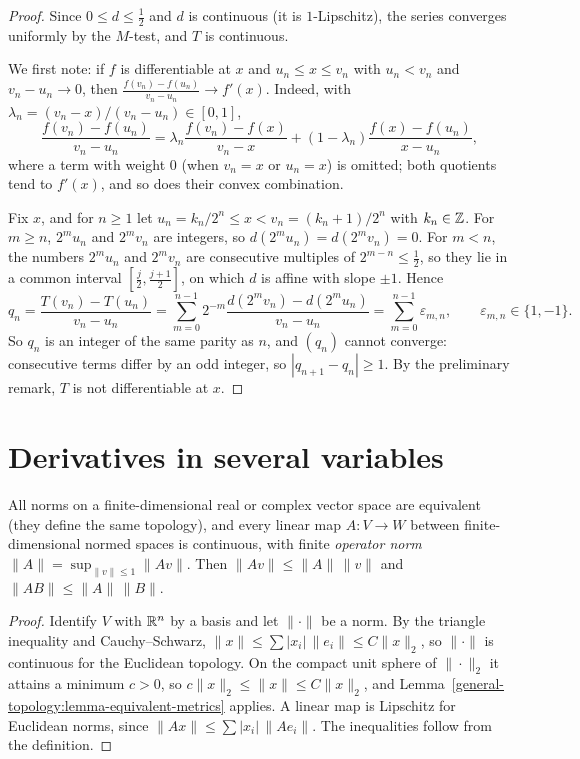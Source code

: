 \begin{proof}
Since $0 \leq d \leq \frac12$ and $d$ is continuous (it is $1$-Lipschitz), the series converges uniformly by the $M$-test, and $T$ is continuous.

We first note: if $f$ is differentiable at $x$ and $u_n \leq x \leq v_n$ with $u_n < v_n$ and $v_n - u_n \to 0$, then $\frac{f(v_n) - f(u_n)}{v_n - u_n} \to f'(x)$. Indeed, with $\lambda_n = (v_n - x)/(v_n - u_n) \in [0, 1]$,
\[
\frac{f(v_n) - f(u_n)}{v_n - u_n} = \lambda_n\frac{f(v_n) - f(x)}{v_n - x} + (1 - \lambda_n)\frac{f(x) - f(u_n)}{x - u_n},
\]
where a term with weight $0$ (when $v_n = x$ or $u_n = x$) is omitted; both quotients tend to $f'(x)$, and so does their convex combination.

Fix $x$, and for $n \geq 1$ let $u_n = k_n/2^n \leq x < v_n = (k_n + 1)/2^n$ with $k_n \in \mathbb{Z}$. For $m \geq n$, $2^mu_n$ and $2^mv_n$ are integers, so $d(2^mu_n) = d(2^mv_n) = 0$. For $m < n$, the numbers $2^mu_n$ and $2^mv_n$ are
consecutive multiples of $2^{m-n} \leq \frac12$, so they lie in a common interval $[\frac j2, \frac{j+1}2]$, on which $d$ is affine with slope $\pm1$. Hence
\[
q_n = \frac{T(v_n) - T(u_n)}{v_n - u_n} = \sum_{m=0}^{n-1}2^{-m}\frac{d(2^mv_n) - d(2^mu_n)}{v_n - u_n} = \sum_{m=0}^{n-1}\varepsilon_{m,n}, \qquad \varepsilon_{m,n} \in \{1, -1\}.
\]
So $q_n$ is an integer of the same parity as $n$, and $(q_n)$ cannot converge: consecutive terms differ by an odd integer, so $|q_{n+1} - q_n| \geq 1$. By the preliminary remark, $T$ is not differentiable at $x$.
\end{proof}

\section{Derivatives in several variables}\label{real-analysis:section-several-variables}

\begin{lemma}\label{real-analysis:lemma-norms}
All norms on a finite-dimensional real or complex vector space are equivalent (they define the same topology), and every linear map $A \colon V \to W$ between finite-dimensional normed spaces is
continuous, with finite \emph{operator norm} $\|A\| = \sup_{\|v\| \leq 1}\|Av\|$. Then $\|Av\| \leq \|A\|\,\|v\|$ and $\|AB\| \leq \|A\|\,\|B\|$.
\end{lemma}

\begin{proof}
Identify $V$ with $\mathbb{R}^n$ by a basis and let $\|\cdot\|$ be a norm. By the triangle inequality and Cauchy--Schwarz, $\|x\| \leq \sum|x_i|\,\|e_i\| \leq C\|x\|_2$, so $\|\cdot\|$ is continuous for the
Euclidean topology. On the compact unit sphere of $\|\cdot\|_2$ it attains a minimum $c > 0$, so $c\|x\|_2 \leq \|x\| \leq C\|x\|_2$, and Lemma~\ref{general-topology:lemma-equivalent-metrics} applies. A linear map
is Lipschitz for Euclidean norms, since $\|Ax\| \leq \sum|x_i|\,\|Ae_i\|$. The inequalities follow from the definition.
\end{proof}

